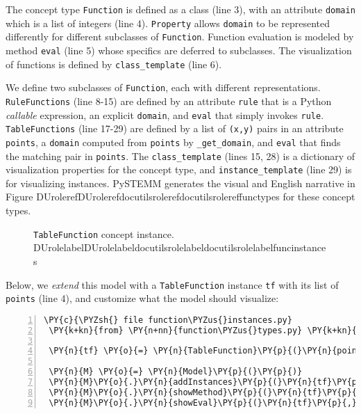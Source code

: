\documentclass[letterpaper,compsoc,twoside]{IEEEtran}
\makeatletter
\def\PY@reset{\let\PY@it=\relax \let\PY@bf=\relax \let\PY@ul=\relax \let\PY@tc=\relax \let\PY@bc=\relax \let\PY@ff=\relax}
\def\PY@tok#1{\csname PY@tok@#1\endcsname}
\def\PY@toks#1+{\ifx\relax#1\empty\else \PY@tok{#1}\expandafter\PY@toks\fi}
\def\PY@do#1{\PY@bc{\PY@tc{\PY@ul{\PY@it{\PY@bf{\PY@ff{#1}}}}}}}
\def\PY#1#2{\PY@reset\PY@toks#1+\relax+\PY@do{#2}}
\def\PYZus{\char`\_}
\def\PYZsh{\char`\#}
\def\PYZsq{\char`\'}
\providecommand*{\DUrole}[2]{\ifcsname DUrole#1\endcsname \csname DUrole#1\endcsname{#2}\else \ifcsname docutilsrole#1\endcsname \csname docutilsrole#1\endcsname{#2}\else #2\fi \fi }
\makeatother
\begin{document}
The concept type \texttt{Function} is defined as a class (line 3), with an attribute \texttt{domain} which is a list of integers (line 4). \textquotedbl{}\texttt{Property}\textquotedbl{} allows \texttt{domain} to be represented differently for different subclasses of \texttt{Function}. Function evaluation is modeled by method \texttt{eval} (line 5) whose specifics are deferred to subclasses. The visualization of functions is defined by \texttt{class\_template} (line 6).

We define two subclasses of \texttt{Function}, each with different representations. \texttt{RuleFunctions} (line 8-15) are defined by an attribute \texttt{rule} that is a Python \emph{callable} expression, an explicit \texttt{domain}, and  \texttt{eval} that simply invokes \texttt{rule}. \texttt{TableFunctions} (line 17-29) are defined by a list of \texttt{(x,y)} pairs in an attribute \texttt{points}, a \texttt{domain}  computed from \texttt{points} by \texttt{\_get\_domain}, and \texttt{eval} that finds the matching pair in \texttt{points}. The \texttt{class\_template} (lines 15, 28) is a dictionary of visualization properties for the concept type, and \texttt{instance\_template} (line 29) is for visualizing instances. PySTEMM generates the visual and English narrative in Figure \DUrole{ref}{functypes} for  these concept types.\begin{figure}[]\noindent{}
\caption{\texttt{TableFunction} concept instance. \DUrole{label}{funcinstances}}
\end{figure}

Below, we \emph{extend} this model with a \texttt{TableFunction} instance \texttt{tf} with its list of \texttt{points} (line 4), and customize what the model should visualize:\begin{Verbatim}[commandchars=\\\{\},numbers=left,firstnumber=1,stepnumber=1,fontsize=\footnotesize,xleftmargin=2.25mm,numbersep=3pt]
 \PY{c}{\PYZsh{} file function\PYZus{}instances.py}
 \PY{k+kn}{from} \PY{n+nn}{function\PYZus{}types.py} \PY{k+kn}{import} \PY{o}{*}

 \PY{n}{tf} \PY{o}{=} \PY{n}{TableFunction}\PY{p}{(}\PY{n}{points}\PY{o}{=}\PY{p}{[}\PY{p}{(}\PY{l+m+mi}{1}\PY{p}{,} \PY{l+m+mi}{10}\PY{p}{)}\PY{p}{,} \PY{p}{(}\PY{l+m+mi}{2}\PY{p}{,} \PY{l+m+mi}{15}\PY{p}{)}\PY{p}{]}\PY{p}{)}

 \PY{n}{M} \PY{o}{=} \PY{n}{Model}\PY{p}{(}\PY{p}{)}
 \PY{n}{M}\PY{o}{.}\PY{n}{addInstances}\PY{p}{(}\PY{n}{tf}\PY{p}{)}
 \PY{n}{M}\PY{o}{.}\PY{n}{showMethod}\PY{p}{(}\PY{n}{tf}\PY{p}{,} \PY{l+s}{\PYZsq{}}\PY{l+s}{eval}\PY{l+s}{\PYZsq{}}\PY{p}{)}
 \PY{n}{M}\PY{o}{.}\PY{n}{showEval}\PY{p}{(}\PY{n}{tf}\PY{p}{,}\PY{l+s}{\PYZsq{}}\PY{l+s}{eval}\PY{l+s}{\PYZsq{}}\PY{p}{,}\PY{p}{[}\PY{l+m+mi}{1}\PY{p}{]}\PY{p}{)}
\end{Verbatim}
\end{document}
